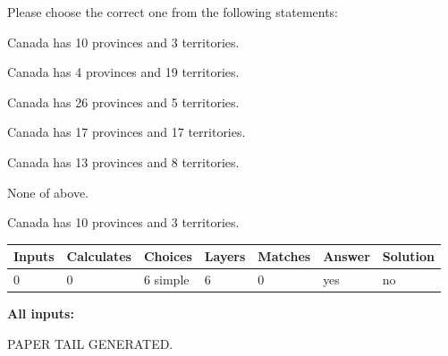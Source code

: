 \documentclass[12pt]{article}
\begin{document}
  
Please choose the correct one from the following statements:
 
 
Canada has 10  provinces and 3 territories.
 
 
Canada has   4 provinces and  19 territories.
 
 
Canada has  26 provinces and  5 territories.
 
 
Canada has  17 provinces and  17 territories.
 
 
Canada has  13 provinces and  8 territories.
 
 
 None of above.
 
 
\noindent{}
 
 
Canada has 10  provinces and 3 territories.
 
 
\noindent{}
 
 
   
   
   
   
\noindent\begin{tabular}{|l|l|l|l|l|l|l|}
 \hline
Inputs & Calculates & Choices & Layers & Matches & Answer & Solution \\ \hline
 0  & 
 0  & 
 6
  simple  
  & 
 6  & 
 0  & 
  yes & 
  no 
  \\ \hline
 \end{tabular}
   
   
   
   
\noindent{}
   
   
   
   
\noindent\vspace{0.1in}\hspace{-0.08in} {\textbf{\Large{All inputs: }}}
   
   
   
   
   
   
 \vspace{0.2in}
 
   
   
\vspace{2.0in} PAPER TAIL GENERATED.
   
   
   
\end{document}

